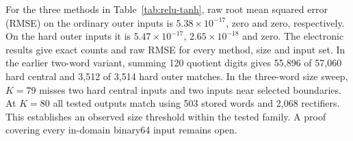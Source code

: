 For the three methods in Table~\ref{tab:relu-tanh}, raw root mean squared error (RMSE) on the ordinary outer inputs is $5.38\times10^{-17}$, zero and zero, respectively. On the hard outer inputs it is $5.47\times10^{-17}$, $2.65\times10^{-18}$ and zero. The electronic results give exact counts and raw RMSE for every method, size and input set. In the earlier two-word variant, summing 120 quotient digits gives 55,896 of 57,060 hard central and 3,512 of 3,514 hard outer matches. In the three-word size sweep, $K=79$ misses two hard central inputs and two inputs near selected boundaries. At $K=80$ all tested outputs match using 503 stored words and 2,068 rectifiers. This establishes an observed size threshold within the tested family. A proof covering every in-domain binary64 input remains open.
